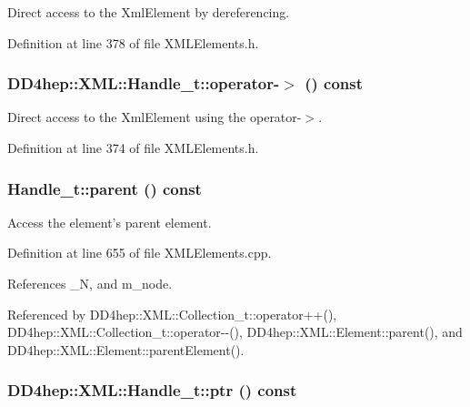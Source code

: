 Direct access to the XmlElement by dereferencing. 

Definition at line 378 of file XMLElements.h.\hypertarget{class_d_d4hep_1_1_x_m_l_1_1_handle__t_adccb04083fd0af9856f8654a03c64fd0}{
\subsubsection[{operator-\/$>$}]{ DD4hep::XML::Handle\_\-t::operator-\/$>$ () const}}
\label{class_d_d4hep_1_1_x_m_l_1_1_handle__t_adccb04083fd0af9856f8654a03c64fd0}


Direct access to the XmlElement using the operator-\/$>$. 

Definition at line 374 of file XMLElements.h.\hypertarget{class_d_d4hep_1_1_x_m_l_1_1_handle__t_a3b6bba67542d2fa93a64e667d6e6ae69}{
\subsubsection[{parent}]{ Handle\_\-t::parent () const}}
\label{class_d_d4hep_1_1_x_m_l_1_1_handle__t_a3b6bba67542d2fa93a64e667d6e6ae69}


Access the element's parent element. 

Definition at line 655 of file XMLElements.cpp.

References \_\-N, and m\_\-node.

Referenced by DD4hep::XML::Collection\_\-t::operator++(), DD4hep::XML::Collection\_\-t::operator-\/-\/(), DD4hep::XML::Element::parent(), and DD4hep::XML::Element::parentElement().\hypertarget{class_d_d4hep_1_1_x_m_l_1_1_handle__t_aaa66248fe9d92f6a59e4f8e1c5b537cc}{
\subsubsection[{ptr}]{ DD4hep::XML::Handle\_\-t::ptr () const}}
\label{class_d_d4hep_1_1_x_m_l_1_1_handle__t_aaa66248fe9d92f6a59e4f8e1c5b537cc}


